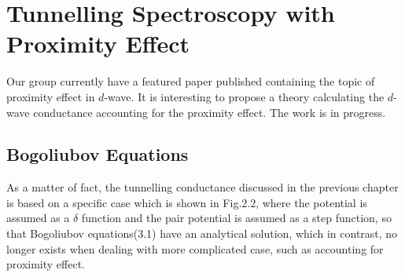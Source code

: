 \chapter{Tunnelling Spectroscopy with Proximity Effect} %
\label{Chapter3}

Our group currently have a featured paper published containing the topic of proximity effect in $d$-wave. It is interesting to propose a theory calculating the $d$-wave conductance accounting for the proximity effect. The work is in progress.
\section{Bogoliubov Equations}
As a matter of fact, the tunnelling conductance discussed in the previous chapter is based on a specific case which is shown in Fig.2.2, where the potential is assumed as a $\delta$ function and the pair potential is assumed as a step function, so that Bogoliubov  equations(3.1) have an analytical solution, which in contrast, no longer exists when dealing with more complicated case, such as accounting for proximity effect.
